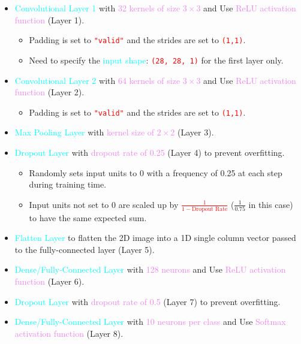 \documentclass{book}
\begin{document}
\begin{itemize}
    \item \textcolor{cyan}{Convolutional Layer 1} with \textcolor{violet}{32 kernels of size $3 \times 3$} and Use \textcolor{violet}{ReLU activation function} (Layer 1).
    \begin{itemize}
        \item Padding is set to \textcolor{red}{\texttt{"valid"}} and the strides are set to \textcolor{red}{\texttt{(1,1)}}.
        \item Need to specify the \textcolor{cyan}{input shape}:  \textcolor{red}{\texttt{(28, 28, 1)}} for the first layer only.
    \end{itemize}
    \item \textcolor{cyan}{Convolutional Layer 2} with \textcolor{violet}{64 kernels of size $3 \times 3$} and Use \textcolor{violet}{ReLU activation function} (Layer 2).
    \begin{itemize}
        \item Padding is set to \textcolor{red}{\texttt{"valid"}} and the strides are set to \textcolor{red}{\texttt{(1,1)}}.
    \end{itemize}
    \item \textcolor{cyan}{Max Pooling Layer} with \textcolor{violet}{kernel size of $2 \times 2$} (Layer 3).
    \item \textcolor{cyan}{Dropout Layer} with \textcolor{violet}{dropout rate of 0.25} (Layer 4) to prevent overfitting.
    \begin{itemize}
        \item Randomly sets input units to 0 with a frequency of 0.25 at each step during training time.
        \item Input units not set to 0 are scaled up by \textcolor{red}{$\frac{1}{1 - \text{Dropout Rate}}$} ($\frac{1}{0.75}$ in this case) to have the same expected sum.
    \end{itemize}
    \item \textcolor{cyan}{Flatten Layer} to flatten the 2D image into a 1D single column vector passed to the fully-connected layer (Layer 5).
    \item \textcolor{cyan}{Dense/Fully-Connected Layer} with \textcolor{violet}{128 neurons} and Use \textcolor{violet}{ReLU activation function} (Layer 6).
    \item \textcolor{cyan}{Dropout Layer} with \textcolor{violet}{dropout rate of 0.5} (Layer 7) to prevent overfitting.
    \item \textcolor{cyan}{Dense/Fully-Connected Layer} with \textcolor{violet}{10 neurons per class} and Use \textcolor{violet}{Softmax activation function} (Layer 8).
\end{itemize}
\end{document}
